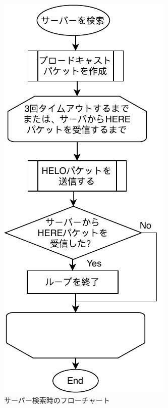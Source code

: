 \documentclass[uplatex,dvipdfmx,11pt,a4paper]{jsarticle} %
\begin{document}
\begin{figure}[H]
\centering
\includegraphics[]{figures/flow/2.pdf}
\caption{サーバー検索時のフローチャート}
\label{fg:search}
\end{figure}
\end{document}
